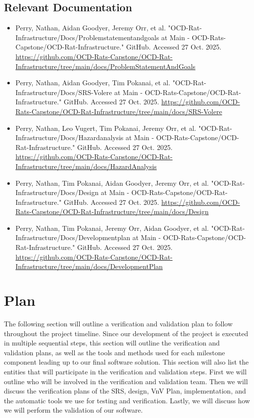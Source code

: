 \documentclass[12pt, titlepage]{article}
\begin{document}
\subsection{Relevant Documentation}

\begin{itemize}
    \item Perry, Nathan, Aidan Goodyer, Jeremy Orr, et al. "OCD-Rat-Infrastructure/Docs/Problemstatementandgoals at Main - OCD-Rats-Capstone/OCD-Rat-Infrastructure." GitHub. Accessed 27 Oct. 2025. \url{https://github.com/OCD-Rats-Capstone/OCD-Rat-Infrastructure/tree/main/docs/ProblemStatementAndGoals}

    \item Perry, Nathan, Aidan Goodyer, Tim Pokanai, et al. "OCD-Rat-Infrastructure/Docs/SRS-Volere at Main - OCD-Rats-Capstone/OCD-Rat-Infrastructure." GitHub. Accessed 27 Oct. 2025. \url{https://github.com/OCD-Rats-Capstone/OCD-Rat-Infrastructure/tree/main/docs/SRS-Volere}

    \item Perry, Nathan, Leo Vugert, Tim Pokanai, Jeremy Orr, et al. "OCD-Rat-Infrastructure/Docs/Hazardanalysis at Main - OCD-Rats-Capstone/OCD-Rat-Infrastructure." GitHub. Accessed 27 Oct. 2025. \url{https://github.com/OCD-Rats-Capstone/OCD-Rat-Infrastructure/tree/main/docs/HazardAnalysis}

    \item Perry, Nathan, Tim Pokanai, Aidan Goodyer, Jeremy Orr, et al. "OCD-Rat-Infrastructure/Docs/Design at Main - OCD-Rats-Capstone/OCD-Rat-Infrastructure." GitHub. Accessed 27 Oct. 2025. \url{https://github.com/OCD-Rats-Capstone/OCD-Rat-Infrastructure/tree/main/docs/Design}

    \item Perry, Nathan, Tim Pokanai, Jeremy Orr, Aidan Goodyer, et al. "OCD-Rat-Infrastructure/Docs/Developmentplan at Main - OCD-Rats-Capstone/OCD-Rat-Infrastructure." GitHub. Accessed 27 Oct. 2025. \url{https://github.com/OCD-Rats-Capstone/OCD-Rat-Infrastructure/tree/main/docs/DevelopmentPlan}
\end{itemize}

\citet{SRS-Volere}

\section{Plan}

\par{The following section will outline a verification and validation plan to follow throughout the project timeline. 
Since our development of the project is executed in multiple sequential steps, this section will outline the verification and validation 
plans, as well as the tools and methods used for each milestone component leading up to our final software solution. This section will also 
list the entities that will participate in the verification and validation steps. First we will outline who will be involved in the 
verification and validation team. Then we will discuss the verification plans of the SRS, design, VnV Plan, implementation, and 
the automatic tools we use for testing and verification. Lastly, we will discuss how we will perform the validation of our software.}
\end{document}
